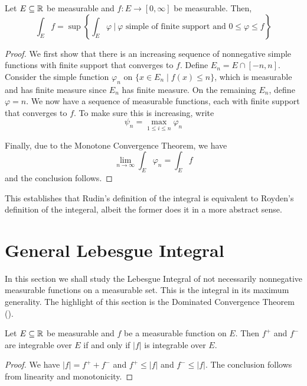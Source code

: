 \begin{proposition}
    Let $E\subseteq\mathbb{R}$ be measurable and $f: E\to[0,\infty]$ be measurable. Then, 
    \begin{equation*}
        \int_E f = \sup\left\{\int_E\varphi~\bigg\vert~\varphi\text{ simple of finite support and }0\le\varphi\le f\right\}
    \end{equation*}
\end{proposition}
\begin{proof}
    We first show that there is an increasing sequence of nonnegative simple functions with finite support that converges to $f$. Define $E_n = E\cap[-n, n]$. Consider the simple function $\varphi_n$ on $\{x\in E_n\mid f(x)\le n\}$, which is measurable and has finite measure since $E_n$ has finite measure. On the remaining $E_n$, define $\varphi = n$. We now have a sequence of measurable functions, each with finite support that converges to $f$. To make sure this is increasing, write 
    \begin{equation*}
        \psi_n = \max_{1\le i\le n}\varphi_n
    \end{equation*}
    
    Finally, due to the Monotone Convergence Theorem, we have 
    \begin{equation*}
        \lim_{n\to\infty}\int_E\varphi_n = \int_E f
    \end{equation*}
    and the conclusion follows.
\end{proof}

This establishes that Rudin's definition of the integral is equivalent to Royden's definition of the integeral, albeit the former does it in a more abstract sense.

\section{General Lebesgue Integral}

In this section we shall study the Lebesgue Integral of not necessarily nonnegative measurable functions on a measurable set. This is the integral in its maximum generality. The highlight of this section is the Dominated Convergence Theorem ().

\begin{proposition}
    Let $E\subseteq\mathbb{R}$ be measurable and $f$ be a measurable function on $E$. Then $f^+$ and $f^-$ are integrable over $E$ if and only if $|f|$ is integrable over $E$.
\end{proposition}
\begin{proof}
    We have $|f| = f^+ + f^-$ and $f^+\le|f|$ and $f^-\le|f|$. The conclusion follows from linearity and monotonicity.
\end{proof}

